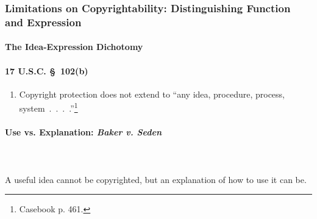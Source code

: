 \subsubsection{Limitations on Copyrightability: Distinguishing Function and 
Expression}

\paragraph{The Idea-Expression Dichotomy}

\paragraph{17 U.S.C. \S\ 102(b)}

\begin{enumerate}
    \item Copyright protection does not extend to ``any idea, procedure, 
    process, system~.~.~.~.''\footnote{Casebook p. 461.}
\end{enumerate}

\paragraph{Use vs. Explanation: \emph{Baker v. Seden}}
~\\\\
A useful idea cannot be copyrighted, but an explanation of how to use it can 
be.

